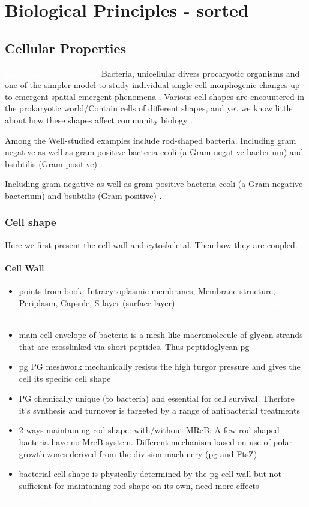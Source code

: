 \documentclass{article}
\newcommand{\todo}[1]{\colorbox{WildStrawberry}{\textcolor{white}{#1}}}
\begin{document}
\section{Biological Principles - sorted}
\subsection{Cellular Properties}

\todo{move this to introduction}
Bacteria, unicellular divers procaryotic organisms and one of the simpler model to study individual single cell morphogenic changes up to emergent spatial emergent phenomena \cite{Vollmer2001}.
Various cell shapes are encountered in the prokaryotic world/Contain cells of different shapes, and yet we know little about how these shapes affect community biology \cite{Smith2017}.

Among the Well-studied examples include rod-shaped bacteria. Including gram negative as well as gram positive bacteria \ac{ecoli} (a Gram-negative bacterium) and \ac{bsubtilis} (Gram-positive) \cite{Chang2014}.

Including gram negative as well as gram positive bacteria \ac{ecoli} (a Gram-negative bacterium) and \ac{bsubtilis} (Gram-positive) \cite{Chang2014}.

\subsubsection{Cell shape}

Here we first present the cell wall and cytoskeletal. Then how they are coupled.

\paragraph{Cell Wall}
\begin{itemize}
    \item points from book: Intracytoplasmic membranes, Membrane structure, Periplasm, Capsule, S-layer (surface layer) \todo{remove when all points have a citation}
    \item \cite{Cava2014} main cell envelope of bacteria is a mesh-like macromolecule of glycan strands that are crosslinked via short peptides. Thus  peptidoglycan \ac{pg}
    \item \cite{vanTeeffelen2018} \ac{pg} PG meshwork mechanically resists the high turgor pressure and gives the cell its specific cell shape
    \item \cite{Cochrane2020} \ac{PG} chemically unique (to bacteria) and essential for cell survival. Therfore it's synthesis and turnover is targeted by a range of antibacterial treatments
    \item \cite{Daniel2003} 2 ways maintaining rod shape: with/without MReB: A few rod-shaped bacteria have no MreB system.
        Different mechanism based on use of polar growth zones derived from the division machinery (\ac{pg} and FtsZ)
    \item \cite{Amir2014} bacterial cell shape is physically determined by the \ac{pg} cell wall but not sufficient for maintaining rod-shape on its own, need more effects \todo{do we need more details from this paper?}
\end{itemize}
\end{document}
